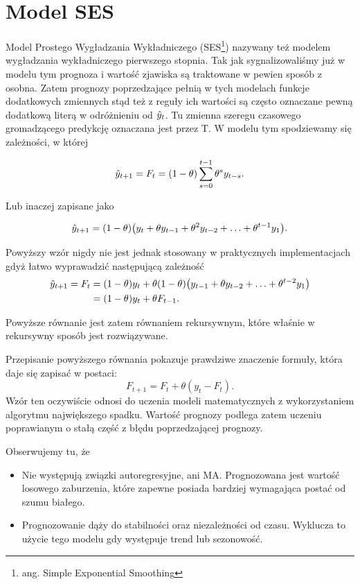 \documentclass[10pt,a4paper]{book}
\begin{document}
\section{Model SES}

Model Prostego Wygładzania Wykładniczego (SES\footnote{ang. Simple Exponential Smoothing}) nazywany też modelem wygładzania wykładniczego pierwszego stopnia. Tak jak sygnalizowaliśmy już w modelu tym prognoza i wartość zjawiska są traktowane w pewien sposób z osobna. Zatem prognozy poprzedzające pełnią w tych modelach funkcje dodatkowych zmiennych stąd też z reguły ich wartości są często oznaczane pewną dodatkową literą w odróżnieniu od $\predict{y}{t}$. Tu zmienna szeregu czasowego gromadzącego predykcję oznaczana jest przez T.  W modelu tym spodziewamy się zależności,  w której

$$
\predict{y}{t+1} =  F_t = (1 - \theta) \sum_{s=0}^{t-1} \theta^s y_{t-s}.
$$

Lub inaczej zapisane jako

$$
\predict{y}{t+1} = (1- \theta) \bracket{ y_t + \theta y_{t-1} + \theta^2 y_{t-2}+ \ldots + \theta^{t-1} y_{1}}.
$$

Powyższy wzór nigdy nie jest jednak stosowany w praktycznych implementacjach gdyż łatwo wyprawadzić następującą zależność 
\begin{align*}
\predict{y}{t+1} = F_t &= (1-\theta) y_t + \theta (1-\theta) \bracket{y_{t-1} + \theta y_{t-2} + \ldots + \theta^{t-2} y_1} \\
&=  (1-\theta ) y_t + \theta F_{t-1}. 
\end{align*}

Powyższe równanie jest zatem równaniem rekursywnym, które właśnie w rekursywny sposób jest rozwiązywane.

Przepisanie powyższego równania pokazuje prawdziwe znaczenie formuły, która daje się zapisać w postaci:
$$
F_{t+1} = F_{t} + \theta (y_t - F_t).
$$
Wzór ten oczywiście odnosi do uczenia modeli matematycznych z wykorzystaniem algorytmu największego spadku. Wartość prognozy podlega zatem uczeniu poprawianym o stałą część z błędu poprzedzającej prognozy.

Obserwujemy tu, że 
\begin{itemize}
\item Nie występują związki autoregresyjne, ani MA. Prognozowana jest wartość losowego zaburzenia, które zapewne posiada bardziej wymagająca postać od szumu białego.
\item Prognozowanie dąży do stabilności oraz niezależności od czasu. Wyklucza to użycie tego modelu gdy występuje trend lub sezonowość.
\end{itemize}
\end{document}
